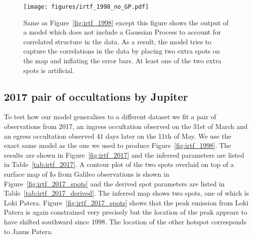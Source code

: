 \documentclass[12pt,dvipsnames]{report}
\begin{document}
\begin{figure}[t!]
    \begin{centering}
    \texttt{[image: figures/irtf\_1998\_no\_GP.pdf]}
    \caption{
        Same as Figure~\ref{fig:irtf_1998} except this figure shows the output of a model which does not include a Gaussian Process to account for correlated structure in the data.
        As a result, the model tries to capture the correlations in the data by placing two extra spots on the map and inflating the error bars.
        At least one of the two extra spots is artificial. 
    }
     \label{fig:irtf_1998_no_GP}
    \end{centering}
\end{figure}


\subsection{2017 pair of occultations by Jupiter}
To test how our model generalises to a different dataset we fit a pair of observations from 2017, an ingress occultation observed on the 31st of March and an egress occultation observed 41 days later on the 11th of May.
We use the exact same model as the one we used to produce Figure~\ref{fig:irtf_1998}.
The results are shown in Figure~\ref{fig:irtf_2017} and the inferred parameters are listed in Table~\ref{tab:irtf_2017}.
A contour plot of the two spots overlaid on top of a surface map of Io from Galileo observations is shown in Figure~\ref{fig:irtf_2017_spots} and the derived spot parameters are listed in Table~\ref{tab:irtf_2017_derived}.
The inferred map shows two spots, one of which is Loki Patera. 
Figure~\ref{fig:irtf_2017_spots} shows that the peak emission from Loki Patera is again constrained very precisely but the location of the peak appears to have shifted southward since 1998.
The location of the other hotspot corresponds to Janus Patera.
\end{document}
